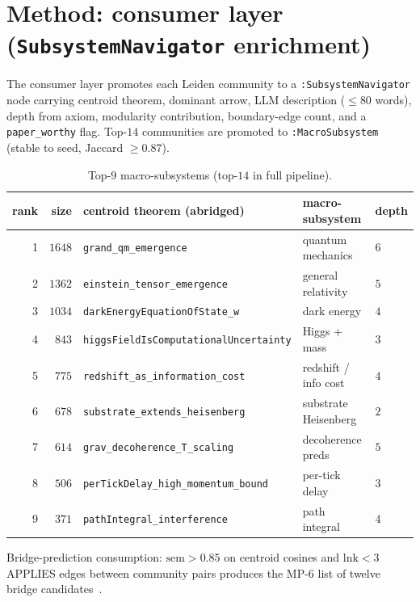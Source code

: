 \documentclass[11pt]{article}
\begin{document}
\section{Method: consumer layer (\texttt{SubsystemNavigator} enrichment)}
\label{sec:consumer}

The consumer layer promotes each Leiden community to a
\lstinline|:SubsystemNavigator| node carrying centroid theorem,
dominant arrow, LLM description ($\leq 80$ words), depth from axiom,
modularity contribution, boundary-edge count, and a
\lstinline|paper_worthy| flag. Top-$14$ communities are promoted to
\lstinline|:MacroSubsystem| (stable to seed, Jaccard $\geq 0.87$).

\begin{table}[h]
\centering
\small
\begin{tabular}{r r l l l}
\toprule
rank & size & centroid theorem (abridged) & macro-subsystem & depth \\
\midrule
1 & $1648$ & \lstinline|grand_qm_emergence|                 & quantum mechanics    & $6$ \\
2 & $1362$ & \lstinline|einstein_tensor_emergence|          & general relativity   & $5$ \\
3 & $1034$ & \lstinline|darkEnergyEquationOfState_w|        & dark energy          & $4$ \\
4 & $843$  & \lstinline|higgsFieldIsComputationalUncertainty|& Higgs + mass        & $3$ \\
5 & $775$  & \lstinline|redshift_as_information_cost|       & redshift / info cost & $4$ \\
6 & $678$  & \lstinline|substrate_extends_heisenberg|       & substrate Heisenberg & $2$ \\
7 & $614$  & \lstinline|grav_decoherence_T_scaling|         & decoherence preds    & $5$ \\
8 & $506$  & \lstinline|perTickDelay_high_momentum_bound|   & per-tick delay       & $3$ \\
9 & $371$  & \lstinline|pathIntegral_interference|          & path integral        & $4$ \\
\bottomrule
\end{tabular}
\caption{Top-$9$ macro-subsystems (top-$14$ in full pipeline).}
\label{tab:subsystems}
\end{table}

Bridge-prediction consumption: $\mathrm{sem} > 0.85$ on centroid cosines
and $\mathrm{lnk} < 3$ APPLIES edges between community pairs produces
the MP-$6$ list of twelve bridge
candidates~\citep{navi2026grothendieck}.
\end{document}

